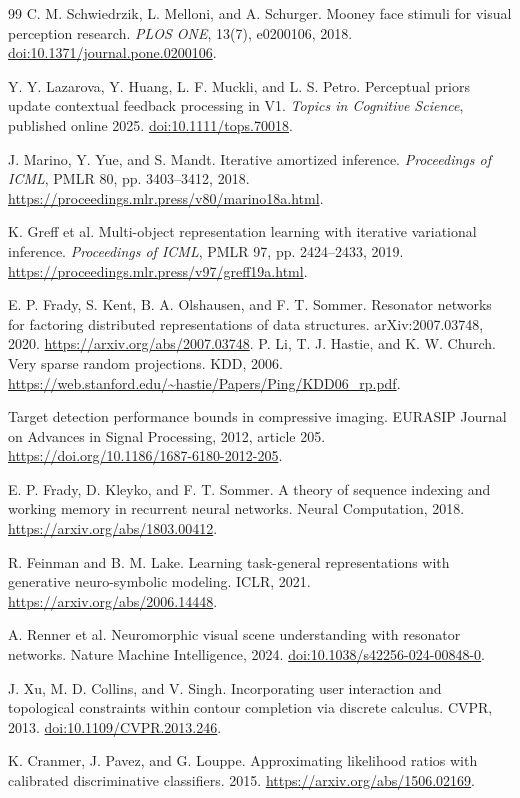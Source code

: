 \documentclass[11pt,letterpaper]{article}
\begin{document}
\begin{thebibliography}{99}
C. M. Schwiedrzik, L. Melloni, and A. Schurger.
Mooney face stimuli for visual perception research.
\emph{PLOS ONE}, 13(7), e0200106, 2018.
\href{https://doi.org/10.1371/journal.pone.0200106}{doi:10.1371/journal.pone.0200106}.

Y. Y. Lazarova, Y. Huang, L. F. Muckli, and L. S. Petro.
Perceptual priors update contextual feedback processing in V1.
\emph{Topics in Cognitive Science}, published online 2025.
\href{https://doi.org/10.1111/tops.70018}{doi:10.1111/tops.70018}.

J. Marino, Y. Yue, and S. Mandt.
Iterative amortized inference.
\emph{Proceedings of ICML}, PMLR 80, pp. 3403--3412, 2018.
\url{https://proceedings.mlr.press/v80/marino18a.html}.

K. Greff et al.
Multi-object representation learning with iterative variational inference.
\emph{Proceedings of ICML}, PMLR 97, pp. 2424--2433, 2019.
\url{https://proceedings.mlr.press/v97/greff19a.html}.

E. P. Frady, S. Kent, B. A. Olshausen, and F. T. Sommer.
Resonator networks for factoring distributed representations of data structures.
arXiv:2007.03748, 2020.
\url{https://arxiv.org/abs/2007.03748}.
P. Li, T. J. Hastie, and K. W. Church. Very sparse random projections. KDD, 2006.
\url{https://web.stanford.edu/~hastie/Papers/Ping/KDD06_rp.pdf}.

Target detection performance bounds in compressive imaging. EURASIP Journal on Advances in Signal Processing, 2012, article 205.
\url{https://doi.org/10.1186/1687-6180-2012-205}.

E. P. Frady, D. Kleyko, and F. T. Sommer. A theory of sequence indexing and working memory in recurrent neural networks. Neural Computation, 2018.
\url{https://arxiv.org/abs/1803.00412}.

R. Feinman and B. M. Lake. Learning task-general representations with generative neuro-symbolic modeling. ICLR, 2021.
\url{https://arxiv.org/abs/2006.14448}.

A. Renner et al. Neuromorphic visual scene understanding with resonator networks. Nature Machine Intelligence, 2024.
\href{https://doi.org/10.1038/s42256-024-00848-0}{doi:10.1038/s42256-024-00848-0}.

J. Xu, M. D. Collins, and V. Singh. Incorporating user interaction and topological constraints within contour completion via discrete calculus. CVPR, 2013.
\href{https://doi.org/10.1109/CVPR.2013.246}{doi:10.1109/CVPR.2013.246}.

K. Cranmer, J. Pavez, and G. Louppe. Approximating likelihood ratios with calibrated discriminative classifiers. 2015.
\url{https://arxiv.org/abs/1506.02169}.
\end{thebibliography}
\end{document}
